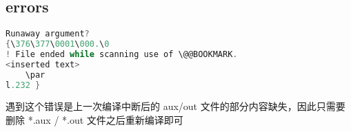 
\newpage
\subsection{errors}

\begin{lstlisting}[language={c}]
Runaway argument?
{\376\377\0001\000.\0
! File ended while scanning use of \@@BOOKMARK.
<inserted text>
    \par
l.232 }
\end{lstlisting}

遇到这个错误是上一次编译中断后的 aux/out 文件的部分内容缺失，因此只需要删除 *.aux / *.out 文件之后重新编译即可

